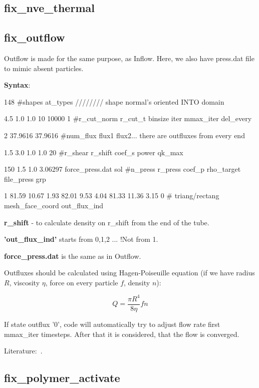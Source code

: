 \subsection{fix\_nve\_thermal}

\subsection{fix\_outflow}

Outflow is made for the same purpose, as Inflow. Here, we also have press.dat file to mimic absent particles.

\textbf{Syntax}:

148 \#shapes at\_types //////// shape normal's oriented INTO domain

4.5 1.0 1.0 10 10000 1 \#r\_cut\_norm r\_cut\_t binsize iter mmax\_iter del\_every

2 37.9616 37.9616 \#num\_flux flux1 flux2... there are outfluxes from every end 

1.5 3.0 1.0 1.0 20 \#r\_shear r\_shift coef\_s power qk\_max

150 1.5 1.0 3.06297 force\_press.dat sol \#n\_press r\_press coef\_p rho\_target file\_press grp

1 81.59 10.67 1.93 82.01 9.53 4.04 81.33 11.36 3.15 0 \# triang/rectang mesh\_face\_coord out\_flux\_ind

\textbf{r\_shift} - to calculate density on r\_shift from the end of the tube.

\textbf{'out\_flux\_ind'} starts from 0,1,2 ... !Not from 1.

\textbf{force\_press.dat} is the same as in Outflow.

Outfluxes should be calculated using Hagen-Poiseuille equation (if we have radius $\textit{R}$, viscosity $\eta$, force on every particle $\textit{f}$, density $\textit{n}$):

\begin{equation}\label{eq:H-P}
Q = \frac{\pi R^{4}}{8 \eta}fn
\end{equation}

If state outflux '0', code will automatically try to adjust flow rate  first mmax\_iter timesteps. After that it is considered, that the flow is converged.

Literature:~\cite{Lei20113765}.

\subsection{fix\_polymer\_activate}
\label{sub:fix_polymer_activate}

